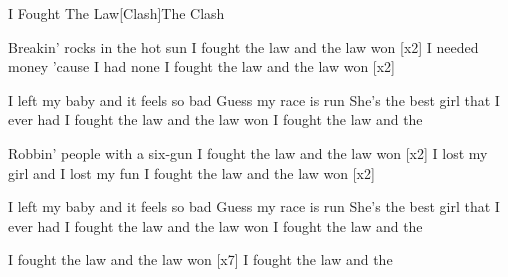 \documentclass[a4paper,11pt,french]{article}
\begin{document}
\begin{Song}{I Fought The Law}[Clash]{The Clash}

\begin{Verse}
Breakin' rocks in the hot sun
I fought the law and the law won [x2]
I needed money 'cause I had none
I fought the law and the law won [x2]
\espaceInterStrophe

I left my baby and it feels so bad
Guess my race is run
She's the best girl that I ever had
I fought the law and the law won
I fought the law and the
\espaceInterStrophe

Robbin' people with a six-gun
I fought the law and the law won [x2]
I lost my girl and I lost my fun
I fought the law and the law won [x2]
\espaceInterStrophe

I left my baby and it feels so bad
Guess my race is run
She's the best girl that I ever had
I fought the law and the law won
I fought the law and the
\espaceInterStrophe

I fought the law and the law won [x7]
I fought the law and the
\end{Verse}

\vfill

\begin{multicols}{2}

\gridGroupNormal

\begin{Chords}
\hline
\\\hline
\end{Chords}
\espaceInterGrille


\begin{Chords}
\hline
\\\hline
\end{Chords}

\end{multicols}

\vfill

\end{Song}

\end{document}
